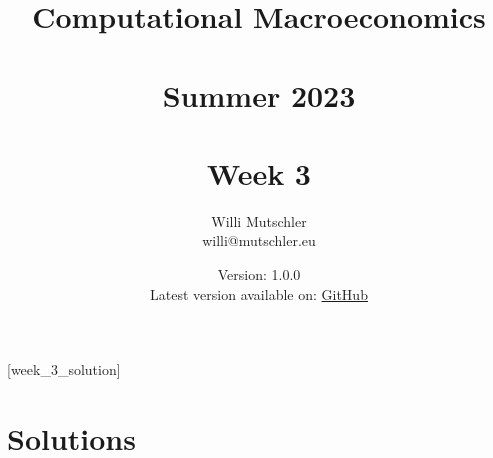 
\newif\ifDisplaySolutions\DisplaySolutionstrue


\title{Computational Macroeconomics\\~\\Summer 2023\\~\\Week 3}
\author{Willi Mutschler\\willi@mutschler.eu}
\date{Version: 1.0.0\\Latest version available on: \href{https://github.com/wmutschl/Computational-Macroeconomics/releases/latest/download/week_3.pdf}{GitHub}}
\maketitle\thispagestyle{empty}

\newpage
{}[week_3_solution]
\tableofcontents\thispagestyle{empty}\newpage

\setcounter{page}{1}
\newpage
\newpage
\newpage
\newpage
\printbibliography
\newpage

\ifDisplaySolutions
\newpage
\appendix
\section{Solutions}

\fi
